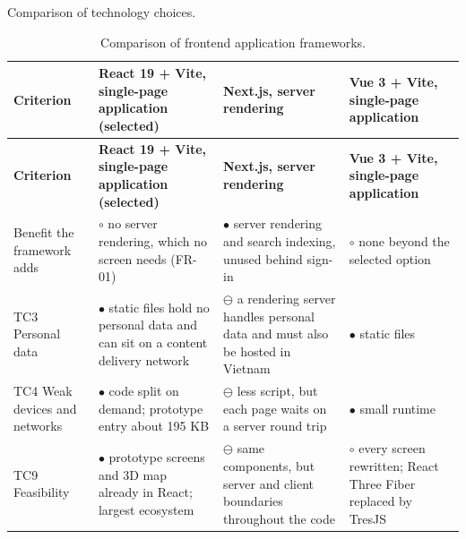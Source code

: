 Comparison of technology choices.

{\small{}\renewcommand{\arraystretch}{1.1}
\begin{longtable}{|>{\raggedright\arraybackslash}p{}|>{\raggedright\arraybackslash}p{}|>{\raggedright\arraybackslash}p{}|>{\raggedright\arraybackslash}p{}|}
\caption{Comparison of frontend application frameworks.} \\
\hline
\textbf{Criterion} & \textbf{React 19 + Vite, single-page application (selected)} & \textbf{Next.js, server rendering\cite{r169}} & \textbf{Vue 3 + Vite, single-page application\cite{r170}} \\ \hline
\endfirsthead
\hline
\textbf{Criterion} & \textbf{React 19 + Vite, single-page application (selected)} & \textbf{Next.js, server rendering\cite{r169}} & \textbf{Vue 3 + Vite, single-page application\cite{r170}} \\ \hline
\endhead
Benefit the framework adds & $\circ$ no server rendering, which no screen needs (FR-01) & $\bullet$ server rendering and search indexing, unused behind sign-in & $\circ$ none beyond the selected option \\ \hline
TC3 Personal data & $\bullet$ static files hold no personal data and can sit on a content delivery network & $\ominus$ a rendering server handles personal data and must also be hosted in Vietnam & $\bullet$ static files \\ \hline
TC4 Weak devices and networks & $\bullet$ code split on demand; prototype entry about 195 KB & $\ominus$ less script, but each page waits on a server round trip & $\bullet$ small runtime \\ \hline
TC9 Feasibility & $\bullet$ prototype screens and 3D map already in React; largest ecosystem\cite{r134} & $\ominus$ same components, but server and client boundaries throughout the code & $\circ$ every screen rewritten; React Three Fiber replaced by TresJS\cite{r171} \\ \hline
\end{longtable}
}

